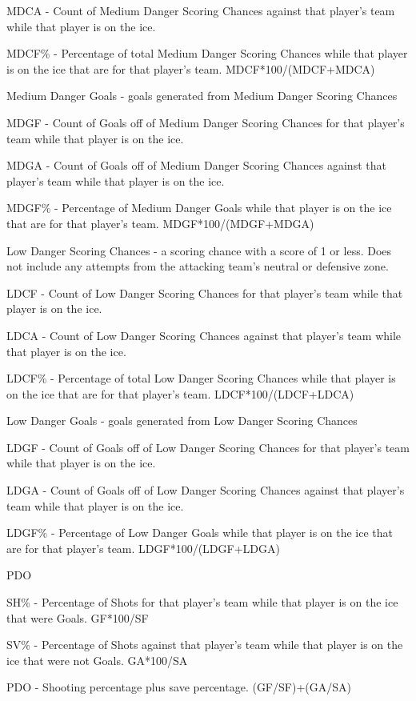 \documentclass[12pt]{article}
\begin{document}
MDCA - Count of Medium Danger Scoring Chances against that player's team while that player is on the ice.

MDCF\% - Percentage of total Medium Danger Scoring Chances while that player is on the ice that are for that player's team. MDCF*100/(MDCF+MDCA)

Medium Danger Goals - goals generated from Medium Danger Scoring Chances

MDGF - Count of Goals off of Medium Danger Scoring Chances for that player's team while that player is on the ice.

MDGA - Count of Goals off of Medium Danger Scoring Chances against that player's team while that player is on the ice.

MDGF\% - Percentage of Medium Danger Goals while that player is on the ice that are for that player's team. MDGF*100/(MDGF+MDGA)

Low Danger Scoring Chances - a scoring chance with a score of 1 or less. Does not include any attempts from the attacking team's neutral or defensive zone.

LDCF - Count of Low Danger Scoring Chances for that player's team while that player is on the ice.

LDCA - Count of Low Danger Scoring Chances against that player's team while that player is on the ice.

LDCF\% - Percentage of total Low Danger Scoring Chances while that player is on the ice that are for that player's team. LDCF*100/(LDCF+LDCA)

Low Danger Goals - goals generated from Low Danger Scoring Chances

LDGF - Count of Goals off of Low Danger Scoring Chances for that player's team while that player is on the ice.

LDGA - Count of Goals off of Low Danger Scoring Chances against that player's team while that player is on the ice.

LDGF\% - Percentage of Low Danger Goals while that player is on the ice that are for that player's team. LDGF*100/(LDGF+LDGA)

PDO

SH\% - Percentage of Shots for that player's team while that player is on the ice that were Goals. GF*100/SF

SV\% - Percentage of Shots against that player's team while that player is on the ice that were not Goals. GA*100/SA

PDO - Shooting percentage plus save percentage. (GF/SF)+(GA/SA)
\end{document}
